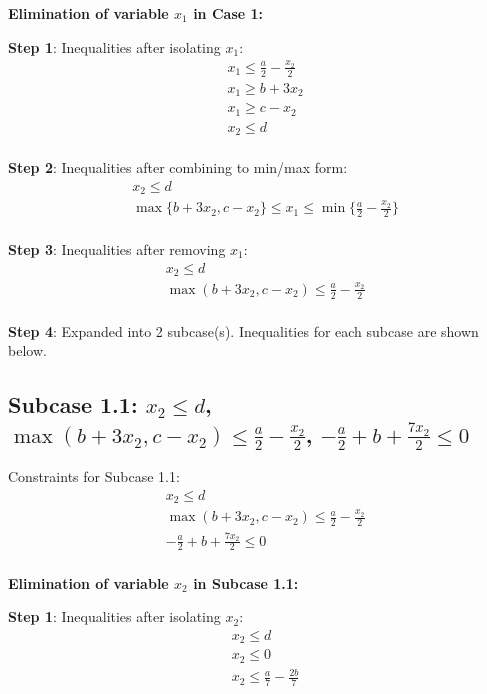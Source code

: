 \documentclass{article}
\begin{document}
\textbf{Elimination of variable $x_{1}$ in Case 1:}

\textbf{Step 1}: Inequalities after isolating $x_{1}$:
\begin{align}
& x_{1} \leq \frac{a}{2} - \frac{x_{2}}{2} \\
& x_{1} \geq b + 3 x_{2} \\
& x_{1} \geq c - x_{2} \\
& x_{2} \leq d \\
\end{align}

\textbf{Step 2}: Inequalities after combining to min/max form:
\begin{align}
& x_{2} \leq d \\
& \max\{b + 3 x_{2}, c - x_{2}\} \leq x_{1} \leq \min\{\frac{a}{2} - \frac{x_{2}}{2}\} \\
\end{align}

\textbf{Step 3}: Inequalities after removing $x_{1}$:
\begin{align}
& x_{2} \leq d \\
& \max\left(b + 3 x_{2}, c - x_{2}\right) \leq \frac{a}{2} - \frac{x_{2}}{2} \\
\end{align}

\textbf{Step 4}: Expanded into 2 subcase(s). Inequalities for each subcase are shown below.

\subsection{Subcase 1.1: $x_{2} \leq d$, $\max\left(b + 3 x_{2}, c - x_{2}\right) \leq \frac{a}{2} - \frac{x_{2}}{2}$, $- \frac{a}{2} + b + \frac{7 x_{2}}{2} \leq 0$}

Constraints for Subcase 1.1:
\begin{align}
& x_{2} \leq d \\
& \max\left(b + 3 x_{2}, c - x_{2}\right) \leq \frac{a}{2} - \frac{x_{2}}{2} \\
& - \frac{a}{2} + b + \frac{7 x_{2}}{2} \leq 0 \\
\end{align}

\textbf{Elimination of variable $x_{2}$ in Subcase 1.1:}

\textbf{Step 1}: Inequalities after isolating $x_{2}$:
\begin{align}
& x_{2} \leq d \\
& x_{2} \leq 0 \\
& x_{2} \leq \frac{a}{7} - \frac{2 b}{7} \\
\end{align}
\end{document}
